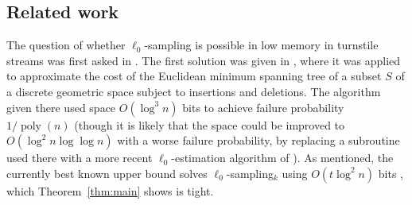 


\subsection{Related work}
The question of whether $\ell_0$-sampling is possible in low memory in turnstile streams was first asked in \cite{CormodeMR05}. The first solution was given in \cite{FrahlingIS08}, where it was applied to approximate the cost of the Euclidean minimum spanning tree of a subset $S$ of a discrete geometric space subject to insertions and deletions. The algorithm given there used space $O(\log^3 n)$ bits to achieve failure probability $1/\mathop{poly}(n)$ (though it is likely that the space could be improved to $O(\log^2 n\log\log n)$ with a worse failure probability, by replacing a subroutine used there with a more recent $\ell_0$-estimation algorithm of \cite{KaneNW10}). As mentioned, the currently best known upper bound solves $\ell_0$-sampling$_k$ using $O(t\log^2 n)$ bits \cite{JowhariST11}, which Theorem~\ref{thm:main} shows is tight.

